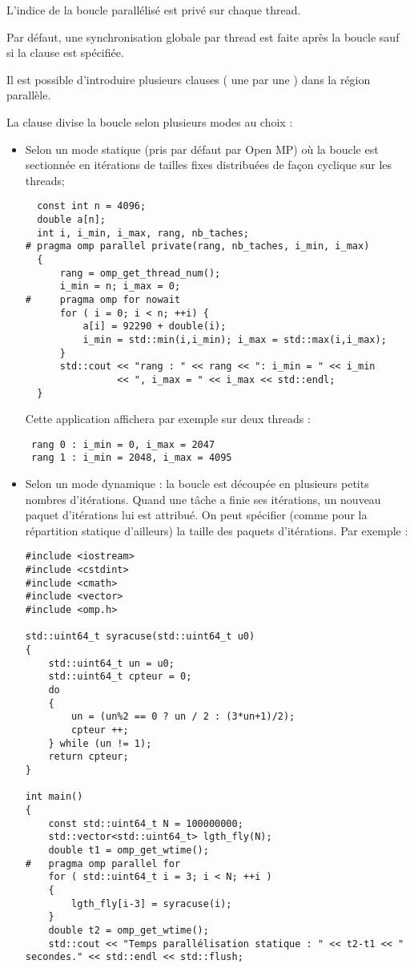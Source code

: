 \documentclass[fleqn,11pt]{article}
\begin{document}
L'indice de la boucle parallélisé est privé sur chaque thread.

Par défaut, une synchronisation globale par thread est faite après la boucle sauf si la clause \verb@nowait@
est spécifiée.

Il est possible d'introduire plusieurs clauses \verb@for@ ( une par une ) dans la région parallèle.

La clause \verb@schedule@ divise la boucle selon plusieurs modes au choix :

\begin{itemize}
 \item Selon un mode statique (pris par défaut par Open MP) où la boucle est sectionnée en itérations de tailles fixes distribuées de façon cyclique sur les threads;
 \begin{lstlisting}
  const int n = 4096;
  double a[n];
  int i, i_min, i_max, rang, nb_taches;
# pragma omp parallel private(rang, nb_taches, i_min, i_max)
  {
      rang = omp_get_thread_num();
      i_min = n; i_max = 0;
#     pragma omp for nowait
      for ( i = 0; i < n; ++i) {
          a[i] = 92290 + double(i);
          i_min = std::min(i,i_min); i_max = std::max(i,i_max);
      }
      std::cout << "rang : " << rang << ": i_min = " << i_min
                << ", i_max = " << i_max << std::endl;
  }
 \end{lstlisting}
 Cette application affichera par exemple sur deux threads :
 \begin{verbatim}
 rang 0 : i_min = 0, i_max = 2047
 rang 1 : i_min = 2048, i_max = 4095 
 \end{verbatim}

 \item Selon un mode dynamique : la boucle est découpée en plusieurs petits nombres d'itérations. Quand une tâche a finie ses itérations, un nouveau paquet d'itérations lui est attribué. On peut spécifier (comme pour
 la répartition statique d'ailleurs) la taille des paquets d'itérations.
 Par exemple :
\begin{lstlisting}
#include <iostream>
#include <cstdint>
#include <cmath>
#include <vector>
#include <omp.h>

std::uint64_t syracuse(std::uint64_t u0)
{
    std::uint64_t un = u0;
    std::uint64_t cpteur = 0;
    do
    {
        un = (un%2 == 0 ? un / 2 : (3*un+1)/2);
        cpteur ++;
    } while (un != 1);
    return cpteur;
}

int main()
{
    const std::uint64_t N = 100000000;
    std::vector<std::uint64_t> lgth_fly(N);
    double t1 = omp_get_wtime();
#   pragma omp parallel for
    for ( std::uint64_t i = 3; i < N; ++i )
    {
        lgth_fly[i-3] = syracuse(i);
    }
    double t2 = omp_get_wtime();
    std::cout << "Temps parallélisation statique : " << t2-t1 << " secondes." << std::endl << std::flush;


\end{lstlisting}
\end{itemize}
\end{document}
